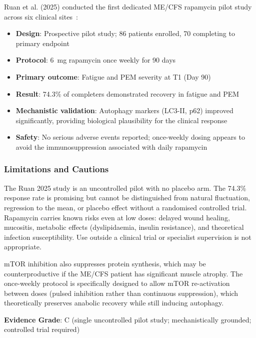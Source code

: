 Ruan et al. (2025) conducted the first dedicated ME/CFS rapamycin pilot study across six clinical sites~\cite{Ruan2025rapamycin}:
\begin{itemize}
    \item \textbf{Design}: Prospective pilot study; 86 patients enrolled, 70 completing to primary endpoint
    \item \textbf{Protocol}: 6~mg rapamycin once weekly for 90 days
    \item \textbf{Primary outcome}: Fatigue and PEM severity at T1 (Day 90)
    \item \textbf{Result}: 74.3\% of completers demonstrated recovery in fatigue and PEM
    \item \textbf{Mechanistic validation}: Autophagy markers (LC3-II, p62) improved significantly, providing biological plausibility for the clinical response
    \item \textbf{Safety}: No serious adverse events reported; once-weekly dosing appears to avoid the immunosuppression associated with daily rapamycin
\end{itemize}

\subsubsection{Limitations and Cautions}

\begin{warning}
The Ruan 2025 study is an uncontrolled pilot with no placebo arm. The 74.3\% response rate is promising but cannot be distinguished from natural fluctuation, regression to the mean, or placebo effect without a randomised controlled trial. Rapamycin carries known risks even at low doses: delayed wound healing, mucositis, metabolic effects (dyslipidaemia, insulin resistance), and theoretical infection susceptibility. Use outside a clinical trial or specialist supervision is not appropriate.
\end{warning}

mTOR inhibition also suppresses protein synthesis, which may be counterproductive if the ME/CFS patient has significant muscle atrophy. The once-weekly protocol is specifically designed to allow mTOR re-activation between doses (pulsed inhibition rather than continuous suppression), which theoretically preserves anabolic recovery while still inducing autophagy.

\textbf{Evidence Grade}: C (single uncontrolled pilot study; mechanistically grounded; controlled trial required)

